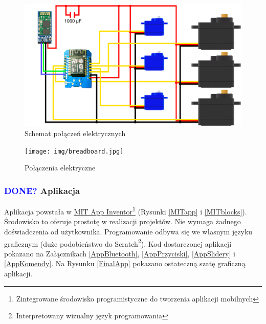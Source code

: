 \documentclass[11pt,titlepage,a4paper]{article}
\begin{document}
\vspace{5cm}

\begin{figure}[h!]
    \begin{center}
        \includegraphics[width=\textwidth]{img/schemat.png}
    \end{center}
    \caption{Schemat połączeń elektrycznych}
    \vspace{4cm}
    \label{SchematElektryczny}
\end{figure}

\begin{figure}[h!]
    \begin{center}
        \texttt{[image: img/breadboard.jpg]}
    \end{center}
    \caption{Połączenia elektryczne}
    \label{Breadboard}
\end{figure}

\subsubsection{\textcolor{blue}{DONE?} Aplikacja}

Aplikacja powstała w \href{https://appinventor.mit.edu}{\underline{MIT App Inventor}}\footnote{Zintegrowane środowisko programistyczne do tworzenia aplikacji mobilnych} (Rysunki \ref{MITapp} i \ref{MITblocks}). Środowisko to oferuje prostotę w realizacji projektów. Nie wymaga żadnego doświadczenia od użytkownika. Programowanie odbywa się we własnym języku graficznym (duże podobieństwo do \href{https://scratch.mit.edu}{\underline{Scratch}}\footnote{Interpretowany wizualny język programowania}). Kod dostarczonej aplikacji pokazano na Załącznikach \ref{AppBluetooth}, \ref{AppPrzyciski}, \ref{AppSlidery} i \ref{AppKomendy}. Na Rysunku \ref{FinalApp} pokazano ostateczną szatę graficzną aplikacji.
\end{document}
